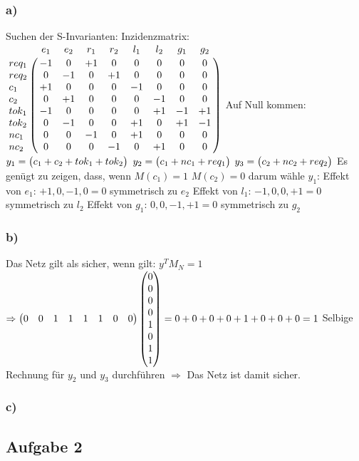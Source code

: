 \documentclass[12pt]{scrreprt}
\begin{document}
\subsubsection*{a)}
Suchen der S-Invarianten:\newline
Inzidenzmatrix:\newline
$\bordermatrix{ %
		&e_1&e_2&r_1&r_2&l_1&l_2&g_1&g_2\cr
req_1	& -1&  0& +1&  0&  0&  0&  0&  0\cr
req_2	&  0& -1&  0& +1&  0&  0&  0&  0\cr
c_1		& +1&  0&  0&  0& -1&  0&  0&  0\cr
c_2		&  0& +1&  0&  0&  0& -1&  0&  0\cr
tok_1	& -1&  0&  0&  0&  0& +1& -1& +1\cr
tok_2	&  0& -1&  0&  0& +1&  0& +1& -1\cr
nc_1	&  0&  0& -1&  0& +1&  0&  0&  0\cr
nc_2	&  0&  0&  0& -1&  0& +1&  0&  0\cr
}$\vspace*{1cm}\newline
Auf Null kommen:\newline
$y_1=\begin{pmatrix}
	c_1 + c_2 + tok_1 + tok_2\cr
\end{pmatrix}$\newline
$y_2=\begin{pmatrix}
	c_1 + nc_1 + req_1\cr
\end{pmatrix}$\newline
$y_3=\begin{pmatrix}
	c_2 + nc_2 + req_2\cr
\end{pmatrix}$\newline
Es genügt zu zeigen, dass, wenn $M(c_1)=1$ $M(c_2)=0$ darum wähle $y_1$:
Effekt von $e_1$: $+1, 0, -1, 0 = 0$ symmetrisch zu $e_2$\newline
Effekt von $l_1$: $-1, 0, 0, +1 = 0$ symmetrisch zu $l_2$\newline
Effekt von $g_1$: $0, 0, -1, +1 = 0$ symmetrisch zu $g_2$\newline

\subsubsection*{b)}
Das Netz gilt als sicher, wenn gilt: $y^TM_N = 1$\newline
$\Rightarrow \begin{pmatrix}0 & 0 & 1 & 1 & 1 & 1 & 0 & 0\end{pmatrix}\begin{pmatrix}0\cr 0\cr 0\cr 0\cr 1\cr 0\cr 1\cr 1\cr\end{pmatrix}=0+0+0+0+1+0+0+0 = 1$\newline
Selbige Rechnung für $y_2$ und $y_3$ durchführen\newline
$\Rightarrow$ Das Netz ist damit sicher.

\subsubsection*{c)}

\subsection*{Aufgabe 2}
\end{document}
